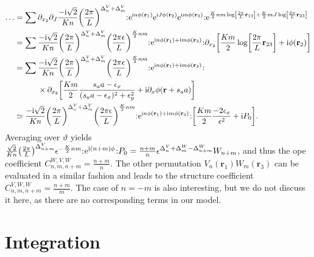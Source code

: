\begin{align*}
\dots &= \sum \partial_{x_2} \partial_J \frac{-\i \sqrt{2}}{Kn} \kla*{\frac{2\pi}{L}}^{\Delta^V_n + \Delta^V_m} \normord{\powe{\i n\phi(\textbf{r}_1)} \powe{\i J\phi(\textbf{r}_2)} \powe{\i m\phi(\textbf{r}_3)}} \powe{ \frac{K}{2}nm \log\klb*{\frac{2\pi}{L}\textbf{r}_{13}} + \frac{K}{2}mJ \log \klb*{\frac{2\pi}{L} \textbf{r}_{23}} }\\
&= \sum \frac{-\i \sqrt{2}}{Kn} \kla*{\frac{2\pi}{L}}^{\Delta^V_n + \Delta^V_m} \kla*{\frac{2\pi\epsilon}{L}}^{\frac{K}{2}nm}  \normord{\powe{\i n\phi(\textbf{r}_1)+\i m\phi(\textbf{r}_3)}} \partial_{x_2} \klb*{\frac{Km}{2} \log \klb*{\frac{2\pi}{L} \textbf{r}_{23}} + \i \phi(\textbf{r}_2)} \\
&= \sum \bsplit{&\frac{-\i \sqrt{2}}{Kn} \kla*{\frac{2\pi}{L}}^{\Delta^V_n + \Delta^V_m} \kla*{\frac{2\pi\epsilon}{L}}^{\frac{K}{2}nm}  \normord{\powe{\i n\phi(\textbf{r}_1)+\i m\phi(\textbf{r}_3)}}\\
&\times\partial_{x_2} \klb*{ \frac{Km}{2} \frac{s_aa - \epsilon_x}{(s_aa - \epsilon_x)^2 + \epsilon_y^2} + \i \partial_x\phi(\textbf{r} + s_aa)}} \\
&\simeq \frac{-\i \sqrt{2}}{Kn} \kla*{\frac{2\pi}{L}}^{\Delta^V_n + \Delta^V_m} \kla*{\frac{2\pi\epsilon}{L}}^{\frac{K}{2}nm} \normord{\powe{\i n\phi(\textbf{r}_1)+\i m\phi(\textbf{r}_3)}} \klb*{ \frac{Km}{2} \frac{-2\epsilon_x}{\epsilon^2} + \i P_0}.
\end{align*}
Averaging over $\vartheta$ yields $\frac{\sqrt{2}}{Kn} \kla*{\frac{2\pi}{L}}^{\Delta_{n+m}^V} \epsilon^{-\frac{K}{2}nm} \normord{\powe{\i (n+m)\phi}} P_0 = \frac{n+m}{n} \epsilon^{\Delta^V_n + \Delta^W_m - \Delta^W_{n+m}}  W_{n+m}$, and thus the \gls{ope} coefficient $C^{W,V,W}_{n,m,n+m} = \frac{n+m}{n}$.
The other permutation $V_n(\textbf{r}_1) W_m(\textbf{r}_3)$ can be evaluated in a similar fashion and leads to the structure coefficient $C^{V,W,W}_{n,m,n+m} = \frac{n+m}{m}$.
The case of $n=-m$ is also interesting, but we do not discuss it here, as there are no corresponding terms in our model.
\section{Integration}\label{sec:integrals}

